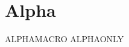 \documentclass[../main.tex]{subfiles}
\newcommand{\AlphaMacro}{ALPHAMACRO}
\begin{document}
\section{Alpha}
\RootMacro
\AlphaMacro
ALPHAONLY
\end{document}
